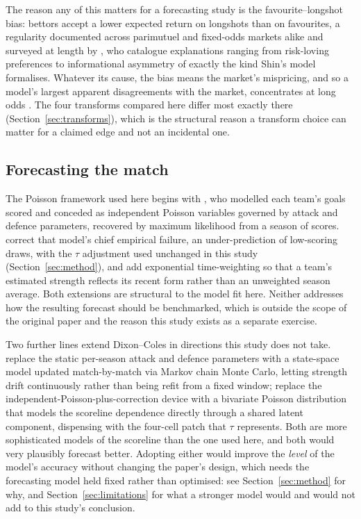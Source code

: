 \documentclass[11pt,a4paper]{article}
\begin{document}
The reason any of this matters for a forecasting study is the
favourite--longshot bias: bettors accept a lower expected return on
longshots than on favourites, a regularity documented across parimutuel and
fixed-odds markets alike and surveyed at length by
\citet{ottaviani2008}, who catalogue explanations ranging from
risk-loving preferences to informational asymmetry of exactly the kind
Shin's model formalises. Whatever its cause, the bias means the market's
mispricing, and so a model's largest apparent disagreements with the
market, concentrates at long odds \citep{cain2000}. The four transforms
compared here differ most exactly there (Section~\ref{sec:transforms}), which
is the structural reason a transform choice can matter for a claimed edge
and not an incidental one.

\subsection{Forecasting the match}

The Poisson framework used here begins with \citet{maher1982}, who modelled
each team's goals scored and conceded as independent Poisson variables
governed by attack and defence parameters, recovered by maximum likelihood
from a season of scores. \citet{dixon1997} correct that model's chief
empirical failure, an under-prediction of low-scoring draws, with the
$\tau$ adjustment used unchanged in this study (Section~\ref{sec:method}),
and add exponential time-weighting so that a team's estimated strength
reflects its recent form rather than an unweighted season average. Both
extensions are structural to the model fit here. Neither addresses how the
resulting forecast should be benchmarked, which is outside the scope of the
original paper and the reason this study exists as a separate exercise.

Two further lines extend Dixon--Coles in directions this study does not take.
\citet{rue2000} replace the static per-season attack and defence parameters
with a state-space model updated match-by-match via Markov chain Monte Carlo,
letting strength drift continuously rather than being refit from a fixed
window; \citet{karlis2003} replace the independent-Poisson-plus-correction
device with a bivariate Poisson distribution that models the scoreline
dependence directly through a shared latent component, dispensing with the
four-cell patch that $\tau$ represents. Both are more sophisticated models of
the scoreline than the one used here, and both would very plausibly forecast
better. Adopting either would improve the \emph{level} of the model's
accuracy without changing the paper's design, which needs the forecasting
model held fixed rather than optimised: see Section~\ref{sec:method} for why,
and Section~\ref{sec:limitations} for what a stronger model would and would
not add to this study's conclusion.
\end{document}
